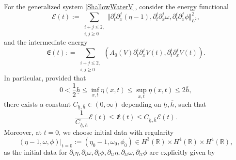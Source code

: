 \documentclass[reqno,11pt]{amsart}
\theoremstyle{plain}
\theoremstyle{definition}
\numberwithin{equation}{section}
\begin{document}
For the generalized system \eqref{ShallowWaterV}, consider the energy functional
\begin{equation}
    \label{Energy}
    \mathcal E(t):= \sum_{\substack{i+j\leq 2,\\ i,j \geq 0}} \Vert\partial_t^i\partial_x ^j (\eta-1),{\partial_t^i\partial_x^j \omega},\partial_t^i\partial_x^{j}\phi\Vert_{L^2}^2,
\end{equation}
and the intermediate energy
\begin{equation}
    \label{intrmd-energy}
    \mathfrak E(t): = \sum_{\substack{i+j\leq 2,\\ i,j \geq 0}} (A_0(V) \partial_t^i \partial_x^j V (t), \partial_t^i \partial_x^j V(t)). 
\end{equation}
In particular, provided that 
\begin{equation}
    \label{non-degenerate}
    0<\frac{1}{2}\underline h \leq \inf_{x,t} \eta(x,t) \leq \sup_{x,t} \eta(x,t) \leq 2 \overline h, 
\end{equation}
there exists a constant $ C_{\underline h, \overline h} \in (0,\infty) $ depending on $ \underline h, \overline h $, such that
\begin{equation}
    \label{energy-eqvlt}
    \frac{1}{C_{\underline h, \overline h}}\mathcal E(t) \leq \mathfrak E(t) \leq C_{\underline h, \overline h} \mathcal E(t).
\end{equation}
Moreover, at $ t = 0 $, we choose initial data with regularity
\begin{equation}\label{V-initialdata} (\eta-1,\omega, \phi)\vert_{t=0} := (\eta_0 -1, \omega_0, \phi_0 ) \in H^3(\mathbb{R}) \times H^4(\mathbb{R}) \times H^4(\mathbb{R}), \end{equation} 
as the initial data for $ \partial_t \eta, \partial_t \omega, \partial_t \phi, \partial_{tt} \eta, \partial_{tt} \omega, \partial_{tt} \phi $ are explicitly given by
\end{document}
